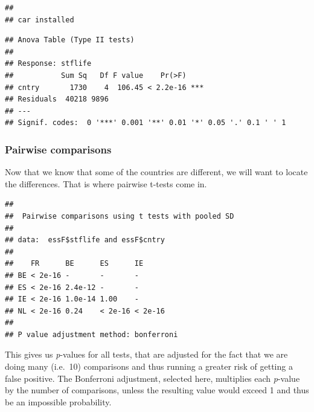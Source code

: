 \documentclass[
]{book}
\newenvironment{Shaded}{\begin{snugshade}}{\end{snugshade}}
\newcommand{\DataTypeTok}[1]{\textcolor[rgb]{0.13,0.29,0.53}{#1}}
\newcommand{\KeywordTok}[1]{\textcolor[rgb]{0.13,0.29,0.53}{\textbf{#1}}}
\newcommand{\NormalTok}[1]{#1}
\newcommand{\OperatorTok}[1]{\textcolor[rgb]{0.81,0.36,0.00}{\textbf{#1}}}
\newcommand{\StringTok}[1]{\textcolor[rgb]{0.31,0.60,0.02}{#1}}
\begin{document}
\begin{verbatim}
## 
## car installed
\end{verbatim}

\begin{Shaded}
\end{Shaded}

\begin{verbatim}
## Anova Table (Type II tests)
## 
## Response: stflife
##           Sum Sq   Df F value    Pr(>F)    
## cntry       1730    4  106.45 < 2.2e-16 ***
## Residuals  40218 9896                      
## ---
## Signif. codes:  0 '***' 0.001 '**' 0.01 '*' 0.05 '.' 0.1 ' ' 1
\end{verbatim}

\hypertarget{pairwise-comparisons}{%
\subsubsection{Pairwise comparisons}\label{pairwise-comparisons}}

Now that we know that some of the countries are different, we will want to locate the differences. That is where pairwise t-tests come in.

\begin{Shaded}
\end{Shaded}

\begin{verbatim}
## 
## 	Pairwise comparisons using t tests with pooled SD 
## 
## data:  essF$stflife and essF$cntry 
## 
##    FR      BE      ES      IE     
## BE < 2e-16 -       -       -      
## ES < 2e-16 2.4e-12 -       -      
## IE < 2e-16 1.0e-14 1.00    -      
## NL < 2e-16 0.24    < 2e-16 < 2e-16
## 
## P value adjustment method: bonferroni
\end{verbatim}

This gives us \emph{p}-values for all tests, that are adjusted for the fact that we are doing many (i.e.~10) comparisons and thus running a greater risk of getting a false positive. The Bonferroni adjustment, selected here, multiplies each \emph{p}-value by the number of comparisons, unless the resulting value would exceed 1 and thus be an impossible probability.
\end{document}
